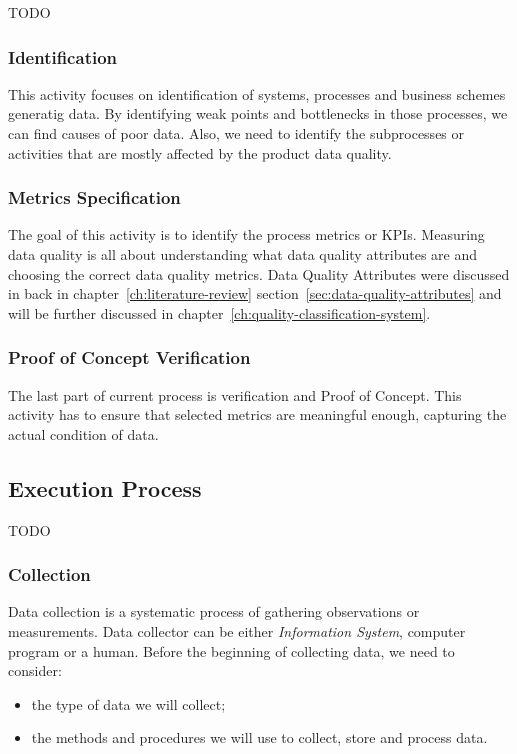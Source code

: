 TODO

\subsubsection{Identification}

This activity focuses on identification of systems, processes and business schemes generatig data.
By identifying weak points and bottlenecks in those processes, we can find causes of poor data.
Also, we need to identify the subprocesses or activities that are mostly affected by the product data quality.

\subsubsection{Metrics Specification}

The goal of this activity is to identify the process metrics or KPIs.
Measuring data quality is all about understanding what data quality attributes are and choosing the correct data quality metrics.
Data Quality Attributes were discussed in back in chapter~\ref{ch:literature-review} section~\ref{sec:data-quality-attributes} and will be further discussed in chapter~\ref{ch:quality-classification-system}.

\subsubsection{Proof of Concept Verification}

The last part of current process is verification and Proof of Concept.
This activity has to ensure that selected metrics are meaningful enough, capturing the actual condition of data.

\subsection{Execution Process}

TODO

\subsubsection{Collection}

Data collection is a systematic process of gathering observations or measurements.
Data collector can be either \textit{Information System}, computer program or a human.
Before the beginning of collecting data, we need to consider:

\begin{itemize}
    \item the type of data we will collect;
    \item the methods and procedures we will use to collect, store and process data.
\end{itemize}

